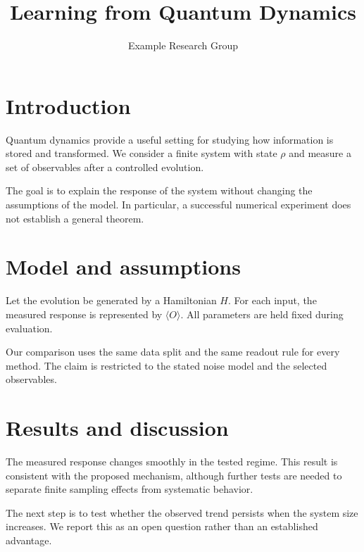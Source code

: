 \documentclass[11pt]{article}
\title{Learning from Quantum Dynamics}
\author{Example Research Group}
\date{}
\begin{document}
\maketitle
\section{Introduction}

Quantum dynamics provide a useful setting for studying how information is stored and transformed. We consider a finite system with state $\rho$ and measure a set of observables after a controlled evolution.

The goal is to explain the response of the system without changing the assumptions of the model. In particular, a successful numerical experiment does not establish a general theorem.

\section{Model and assumptions}

Let the evolution be generated by a Hamiltonian $H$. For each input, the measured response is represented by $\langle O \rangle$. All parameters are held fixed during evaluation.

Our comparison uses the same data split and the same readout rule for every method. The claim is restricted to the stated noise model and the selected observables.

\section{Results and discussion}

The measured response changes smoothly in the tested regime. This result is consistent with the proposed mechanism, although further tests are needed to separate finite sampling effects from systematic behavior.

The next step is to test whether the observed trend persists when the system size increases. We report this as an open question rather than an established advantage.
\end{document}
